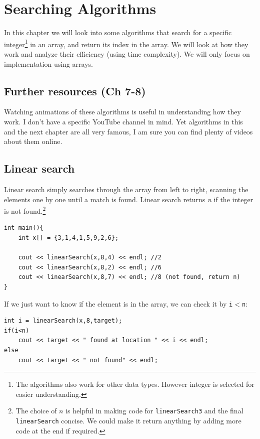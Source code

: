 \chapter{Searching Algorithms}

In this chapter we will look into some algorithms that search for a specific integer\footnote{The algorithms also work for other data types. However integer is selected for easier understanding.} in an array, and return its index in the array. We will look at how they work and analyze their efficiency (using time complexity). We will only focus on implementation using arrays.

\section{Further resources (Ch 7-8)}

Watching animations of these algorithms is useful in understanding how they work. I don't have a specific YouTube channel in mind. Yet algorithms in this and the next chapter are all very famous, I am sure you can find plenty of videos about them online.

\section{Linear search}

Linear search simply searches through the array from left to right, scanning the elements one by one until a match is found. Linear search returns \textit{n} if the integer is not found.\footnote{The choice of $n$ is helpful in making code for \texttt{linearSearch3} and the final \texttt{linearSearch} concise. We could make it return anything by adding more code at the end if required.}

\begin{lstlisting}
int main(){
    int x[] = {3,1,4,1,5,9,2,6};

    cout << linearSearch(x,8,4) << endl; //2
    cout << linearSearch(x,8,2) << endl; //6
    cout << linearSearch(x,8,7) << endl; //8 (not found, return n)
}
\end{lstlisting}

If we just want to know if the element is in the array, we can check it by \texttt{i$<$n}:

\begin{lstlisting}
int i = linearSearch(x,8,target);
if(i<n)
    cout << target << " found at location " << i << endl;
else 
    cout << target << " not found" << endl;
\end{lstlisting}

